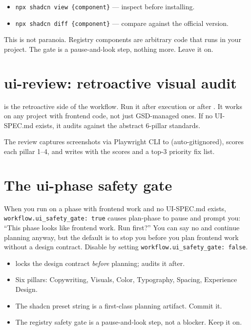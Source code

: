 \documentclass[11pt,letterpaper,openany]{book}
\begin{document}
\begin{itemize}[itemsep=2pt]
  \item \texttt{npx shadcn view \{component\}} --- inspect before installing.
  \item \texttt{npx shadcn diff \{component\}} --- compare against the official version.
\end{itemize}

This is not paranoia. Registry components are arbitrary code that runs in your project. The gate is a pause-and-look step, nothing more. Leave it on.

\section{ui-review: retroactive visual audit}

 is the retroactive side of the workflow. Run it after execution or after . It works on any project with frontend code, not just GSD-managed ones. If no UI-SPEC.md exists, it audits against the abstract 6-pillar standards.

The review captures screenshots via Playwright CLI to  (auto-gitignored), scores each pillar 1--4, and writes  with the scores and a top-3 priority fix list.

\section{The ui-phase safety gate}

When you run  on a phase with frontend work and no UI-SPEC.md exists, \texttt{workflow.ui\_safety\_gate: true} causes plan-phase to pause and prompt you: ``This phase looks like frontend work. Run  first?'' You can say no and continue planning anyway, but the default is to stop you before you plan frontend work without a design contract. Disable by setting \texttt{workflow.ui\_safety\_gate: false}.

\begin{gsdnote}[title=Key Takeaways]
\begin{itemize}[itemsep=2pt,leftmargin=1.2em]
  \item {} locks the design contract \emph{before} planning;  audits it after.
  \item Six pillars: Copywriting, Visuals, Color, Typography, Spacing, Experience Design.
  \item The shadcn preset string is a first-class planning artifact. Commit it.
  \item The registry safety gate is a pause-and-look step, not a blocker. Keep it on.
\end{itemize}
\end{gsdnote}
\end{document}
